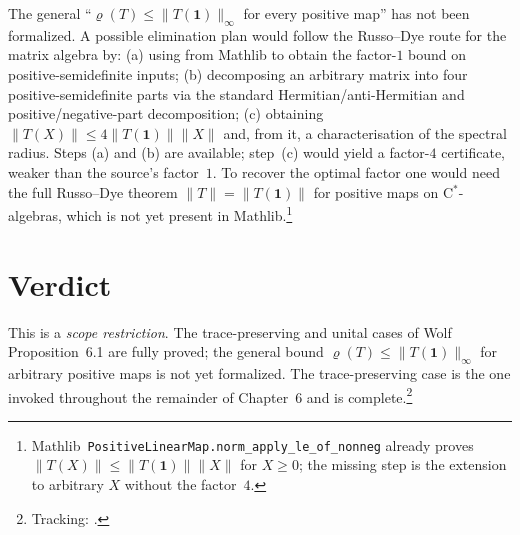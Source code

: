 \documentclass{article}
\begin{document}
The general ``$\varrho(T)\le\|T(\mathbf 1)\|_\infty$ for every positive map''
has not been formalized.  A possible elimination plan would follow the
Russo--Dye route for the matrix algebra by: (a) using
 from Mathlib to obtain
the factor-$1$ bound on positive-semidefinite inputs; (b) decomposing an
arbitrary matrix into four positive-semidefinite parts via the standard
Hermitian/anti-Hermitian and positive/negative-part decomposition; (c) obtaining
$\|T(X)\|\le 4\|T(\mathbf 1)\|\|X\|$ and, from it, a characterisation of
the spectral radius.  Steps (a) and (b) are available; step~(c) would yield
a factor-$4$ certificate, weaker than the source's factor~$1$.  To recover
the optimal factor one would need the full Russo--Dye theorem
$\|T\|=\|T(\mathbf 1)\|$ for positive maps on C$^\ast$-algebras, which
is not yet present in Mathlib.\footnote{Mathlib~\texttt{PositiveLinearMap.norm\_apply\_le\_of\_nonneg}
already proves $\|T(X)\|\le\|T(\mathbf 1)\|\|X\|$ for $X\ge0$; the missing
step is the extension to arbitrary $X$ without the factor~$4$.}

\section{Verdict}

This is a \emph{scope restriction}.  The trace-preserving and unital cases of
Wolf Proposition~6.1 are fully proved; the general bound
$\varrho(T)\le\|T(\mathbf 1)\|_\infty$ for arbitrary positive maps is not
yet formalized.  The trace-preserving case is the one invoked throughout the
remainder of Chapter~6 and is complete.\footnote{Tracking: .}



\end{document}

